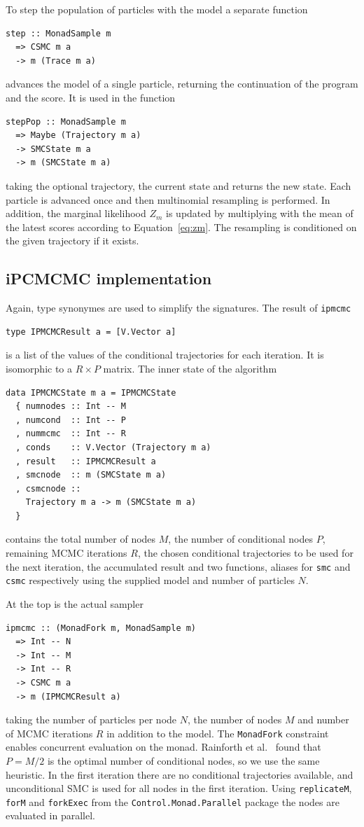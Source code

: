 To step the population of particles with the model a separate function
\begin{verbatim}
step :: MonadSample m
  => CSMC m a
  -> m (Trace m a)
\end{verbatim}
advances the model of a single particle, returning the continuation of the program and the score. It is used in the function
\begin{verbatim}
stepPop :: MonadSample m
  => Maybe (Trajectory m a)
  -> SMCState m a
  -> m (SMCState m a)
\end{verbatim}
taking the optional trajectory, the current state and returns the new state. Each particle is advanced once and then multinomial resampling is performed. In addition, the marginal likelihood $Z_m$ is updated by multiplying with the mean of the latest scores according to Equation~\ref{eq:zm}. The resampling is conditioned on the given trajectory if it exists.

\subsection{iPCMCMC implementation}
\label{sub:ipcmcmc_implementation}

Again, type synonymes are used to simplify the signatures. The result of \texttt{ipmcmc}
\begin{verbatim}
type IPMCMCResult a = [V.Vector a]
\end{verbatim}
is a list of the values of the conditional trajectories for each iteration. It is isomorphic to a $R\times P$ matrix. The inner state of the algorithm
\begin{verbatim}
data IPMCMCState m a = IPMCMCState
  { numnodes :: Int -- M
  , numcond  :: Int -- P
  , nummcmc  :: Int -- R
  , conds    :: V.Vector (Trajectory m a) 
  , result   :: IPMCMCResult a 
  , smcnode  :: m (SMCState m a) 
  , csmcnode ::
    Trajectory m a -> m (SMCState m a) 
  }
\end{verbatim}
contains the total number of nodes $M$, the number of conditional nodes $P$, remaining MCMC iterations $R$, the chosen conditional trajectories to be used for the next iteration, the accumulated result and two functions, aliases for \texttt{smc} and \texttt{csmc} respectively using the supplied model and number of particles $N$.

At the top is the actual sampler
\begin{verbatim}
ipmcmc :: (MonadFork m, MonadSample m)
  => Int -- N
  -> Int -- M
  -> Int -- R
  -> CSMC m a
  -> m (IPMCMCResult a)
\end{verbatim}
taking the number of particles per node $N$, the number of nodes $M$ and number of MCMC iterations $R$ in addition to the model. The \texttt{MonadFork} constraint enables concurrent evaluation on the monad. Rainforth et al.~\cite{ipmcmc} found that $P = M/2$ is the optimal number of conditional nodes, so we use the same heuristic. In the first iteration there are no conditional trajectories available, and unconditional SMC is used for all nodes in the first iteration. Using \texttt{replicateM}, \texttt{forM} and \texttt{forkExec} from the \texttt{Control.Monad.Parallel} package the nodes are evaluated in parallel.

